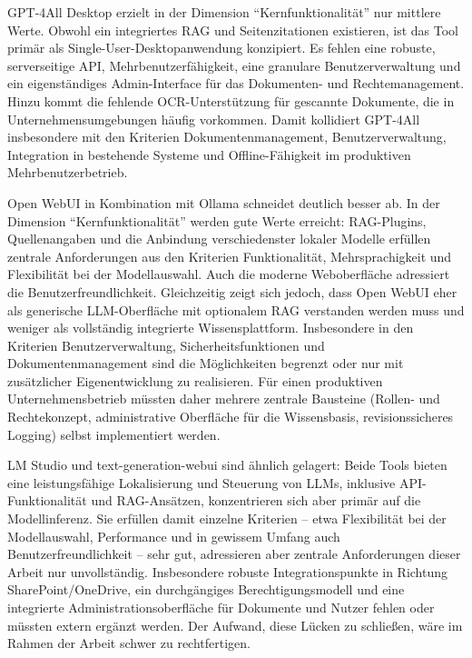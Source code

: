 GPT-4All Desktop erzielt in der Dimension \enquote{Kernfunktionalität} nur mittlere Werte.
Obwohl ein integriertes RAG und Seitenzitationen existieren, ist das Tool primär als Single-User-Desktopanwendung konzipiert.
Es fehlen eine robuste, serverseitige API, Mehrbenutzerfähigkeit, eine granulare Benutzerverwaltung und ein eigenständiges Admin-Interface für das Dokumenten- und Rechtemanagement.
Hinzu kommt die fehlende OCR-Unterstützung für gescannte Dokumente, die in Unternehmensumgebungen häufig vorkommen.
Damit kollidiert GPT-4All insbesondere mit den Kriterien Dokumentenmanagement, Benutzerverwaltung, Integration in bestehende Systeme und Offline-Fähigkeit im produktiven Mehrbenutzerbetrieb.

Open WebUI in Kombination mit Ollama schneidet deutlich besser ab.
In der Dimension \enquote{Kernfunktionalität} werden gute Werte erreicht: RAG-Plugins, Quellenangaben und die Anbindung verschiedenster lokaler Modelle erfüllen zentrale Anforderungen aus den Kriterien Funktionalität, Mehrsprachigkeit und Flexibilität bei der Modellauswahl.
Auch die moderne Weboberfläche adressiert die Benutzerfreundlichkeit.
Gleichzeitig zeigt sich jedoch, dass Open WebUI eher als generische LLM-Oberfläche mit optionalem RAG verstanden werden muss und weniger als vollständig integrierte Wissensplattform.
Insbesondere in den Kriterien Benutzerverwaltung, Sicherheitsfunktionen und Dokumentenmanagement sind die Möglichkeiten begrenzt oder nur mit zusätzlicher Eigenentwicklung zu realisieren.
Für einen produktiven Unternehmensbetrieb müssten daher mehrere zentrale Bausteine (Rollen- und Rechtekonzept, administrative Oberfläche für die Wissensbasis, revisionssicheres Logging) selbst implementiert werden.

LM Studio und text-generation-webui sind ähnlich gelagert:
Beide Tools bieten eine leistungsfähige Lokalisierung und Steuerung von LLMs, inklusive API-Funktionalität und RAG-Ansätzen, konzentrieren sich aber primär auf die Modellinferenz.
Sie erfüllen damit einzelne Kriterien – etwa Flexibilität bei der Modellauswahl, Performance und in gewissem Umfang auch Benutzerfreundlichkeit – sehr gut, adressieren aber zentrale Anforderungen dieser Arbeit nur unvollständig.
Insbesondere robuste Integrationspunkte in Richtung SharePoint/OneDrive, ein durchgängiges Berechtigungsmodell und eine integrierte Administrationsoberfläche für Dokumente und Nutzer fehlen oder müssten extern ergänzt werden.
Der Aufwand, diese Lücken zu schließen, wäre im Rahmen der Arbeit schwer zu rechtfertigen.

